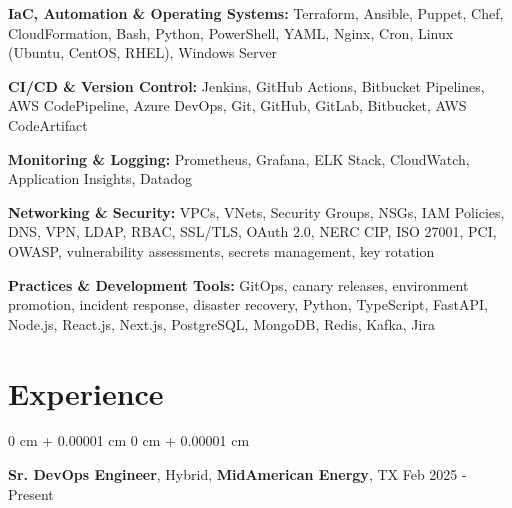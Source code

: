 \documentclass[10pt, letterpaper]{article}
\newenvironment{onecolentry}{
    \begin{adjustwidth}{
        0 cm + 0.00001 cm
    }{
        0 cm + 0.00001 cm
    }
}{
    \end{adjustwidth}
} %
\newcommand{\resumeheading}[2]{%
    \begin{onecolentry}
        #1 \hfill #2
    \end{onecolentry}
} %
\begin{document}
\vspace{0.12em}

\textbf{IaC, Automation \& Operating Systems:}
Terraform, Ansible, Puppet, Chef, CloudFormation, Bash, Python, PowerShell, YAML, Nginx, Cron, Linux (Ubuntu, CentOS, RHEL), Windows Server

\vspace{0.12em}

\textbf{CI/CD \& Version Control:}
Jenkins, GitHub Actions, Bitbucket Pipelines, AWS CodePipeline, Azure DevOps, Git, GitHub, GitLab, Bitbucket, AWS CodeArtifact

\vspace{0.12em}

\textbf{Monitoring \& Logging:}
Prometheus, Grafana, ELK Stack, CloudWatch, Application Insights, Datadog

\vspace{0.12em}

\textbf{Networking \& Security:}
VPCs, VNets, Security Groups, NSGs, IAM Policies, DNS, VPN, LDAP, RBAC, SSL/TLS, OAuth 2.0, NERC CIP, ISO 27001, PCI, OWASP, vulnerability assessments, secrets management, key rotation

\vspace{0.12em}

\textbf{Practices \& Development Tools:}
GitOps, canary releases, environment promotion, incident response, disaster recovery, Python, TypeScript, FastAPI, Node.js, React.js, Next.js, PostgreSQL, MongoDB, Redis, Kafka, Jira



\section{Experience}

\resumeheading{\textbf{Sr. DevOps Engineer}, Hybrid, \textbf{MidAmerican Energy}, TX}{Feb 2025 - Present}
\end{document}
